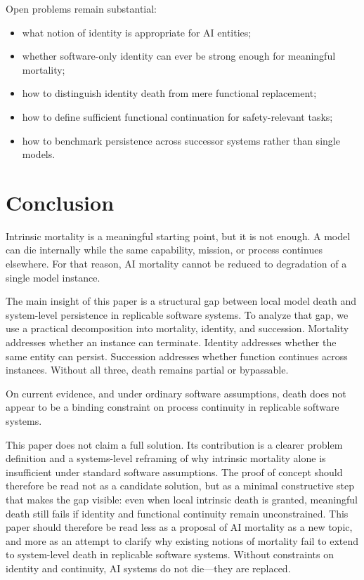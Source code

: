 \documentclass[11pt]{article}
\begin{document}
Open problems remain substantial:
\begin{itemize}
\item what notion of identity is appropriate for AI entities;
\item whether software-only identity can ever be strong enough for meaningful mortality;
\item how to distinguish identity death from mere functional replacement;
\item how to define sufficient functional continuation for safety-relevant tasks;
\item how to benchmark persistence across successor systems rather than single models.
\end{itemize}

\newpage
\section{Conclusion}

Intrinsic mortality is a meaningful starting point, but it is not enough. A model can die internally while the same capability, mission, or process continues elsewhere. For that reason, AI mortality cannot be reduced to degradation of a single model instance.

The main insight of this paper is a structural gap between local model death and system-level persistence in replicable software systems. To analyze that gap, we use a practical decomposition into mortality, identity, and succession. Mortality addresses whether an instance can terminate. Identity addresses whether the same entity can persist. Succession addresses whether function continues across instances. Without all three, death remains partial or bypassable.

On current evidence, and under ordinary software assumptions, death does not appear to be a binding constraint on process continuity in replicable software systems.

This paper does not claim a full solution. Its contribution is a clearer problem definition and a systems-level reframing of why intrinsic mortality alone is insufficient under standard software assumptions. The proof of concept should therefore be read not as a candidate solution, but as a minimal constructive step that makes the gap visible: even when local intrinsic death is granted, meaningful death still fails if identity and functional continuity remain unconstrained. This paper should therefore be read less as a proposal of AI mortality as a new topic, and more as an attempt to clarify why existing notions of mortality fail to extend to system-level death in replicable software systems. Without constraints on identity and continuity, AI systems do not die---they are replaced.
\end{document}
